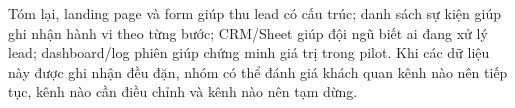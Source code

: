 Tóm lại, landing page và form giúp thu lead có cấu trúc; danh sách sự kiện giúp
ghi nhận hành vi theo từng bước; CRM/Sheet giúp đội ngũ biết ai đang xử lý lead;
dashboard/log phiên giúp chứng minh giá trị trong pilot. Khi các dữ liệu này
được ghi nhận đều đặn, nhóm có thể đánh giá khách quan kênh nào nên tiếp tục,
kênh nào cần điều chỉnh và kênh nào nên tạm dừng.

